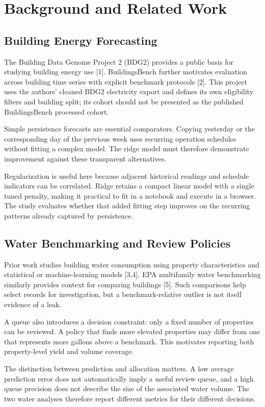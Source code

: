 \documentclass[12pt,a4paper]{article}
\begin{document}
\newpage
\section{Background and Related Work}
\subsection{Building Energy Forecasting}
The Building Data Genome Project 2 (BDG2) provides a public basis for studying building energy use [1]. BuildingsBench further motivates evaluation across building time series with explicit benchmark protocols [2]. This project uses the authors' cleaned BDG2 electricity export and defines its own eligibility filters and building split; its cohort should not be presented as the published BuildingsBench processed cohort.

Simple persistence forecasts are essential comparators. Copying yesterday or the corresponding day of the previous week uses recurring operation schedules without fitting a complex model. The ridge model must therefore demonstrate improvement against these transparent alternatives.

Regularization is useful here because adjacent historical readings and schedule indicators can be correlated. Ridge retains a compact linear model with a single tuned penalty, making it practical to fit in a notebook and execute in a browser. The study evaluates whether that added fitting step improves on the recurring patterns already captured by persistence.

\subsection{Water Benchmarking and Review Policies}
Prior work studies building water consumption using property characteristics and statistical or machine-learning models [3,4]. EPA multifamily water benchmarking similarly provides context for comparing buildings [5]. Such comparisons help select records for investigation, but a benchmark-relative outlier is not itself evidence of a leak.

A queue also introduces a decision constraint: only a fixed number of properties can be reviewed. A policy that finds more elevated properties may differ from one that represents more gallons above a benchmark. This motivates reporting both property-level yield and volume coverage.

The distinction between prediction and allocation matters. A low average prediction error does not automatically imply a useful review queue, and a high queue precision does not describe the size of the associated water volume. The two water analyses therefore report different metrics for their different decisions.
\end{document}
